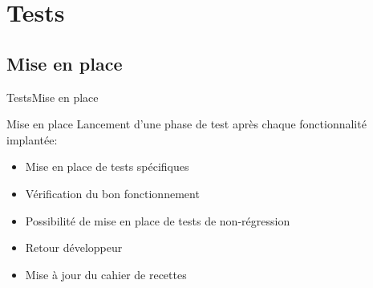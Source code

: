 \section{Tests}

   \subsection{Mise en place}
      \begin{frame}{Tests}{Mise en place}
        \begin{block}{Mise en place}
          Lancement d'une phase de test après chaque fonctionnalité implantée:
          \begin{itemize}
            \item<1-> Mise en place de tests spécifiques
            \item<2-> Vérification du bon fonctionnement
            \item<3-> Possibilité de mise en place de tests de non-régression
            \item<4-> Retour développeur
            \item<5-> Mise à jour du cahier de recettes
          \end{itemize}
        \end{block}
      \end{frame}
